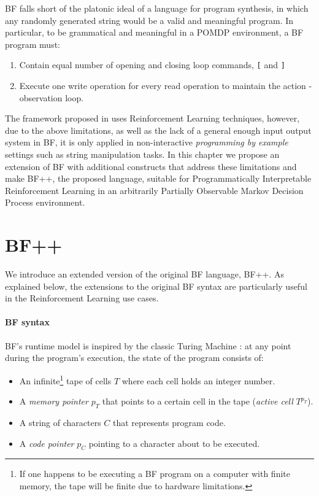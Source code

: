 BF falls short of the platonic ideal of a language for program synthesis, in which any randomly generated string would be a valid and meaningful program.
In particular, to be grammatical and meaningful in a POMDP environment, a BF program must:
\begin{enumerate}
    \item Contain equal number of opening and closing loop commands, \texttt{[} and \texttt{]}
    \item Execute one write operation for every read operation to maintain the action - observation loop.
\end{enumerate}

The framework proposed in \cite{abolafiaNeuralProgramSynthesis2018} uses Reinforcement Learning techniques, however, due to the above limitations, as well as the lack of a general enough input output system in BF, it is only applied in non-interactive \emph{programming by example} settings such as string manipulation tasks.
In this chapter we propose an extension of BF with additional constructs that address these limitations and make BF++, the proposed language, suitable for Programmatically Interpretable Reinforcement Learning in an arbitrarily Partially Observable Markov Decision Process environment.

\newpage
\section{BF++}
\label{sec:language}

We introduce an extended version of the original BF language, BF++. 
As explained below, the extensions to the original BF syntax are particularly useful in the Reinforcement Learning use cases. 

\paragraph{BF syntax}
\label{sec:bf}

BF's runtime model is inspired by the classic Turing Machine \cite{turing}: at any point during the program's execution, the state of the program consists of:

\begin{itemize}
    \item An infinite\footnote{If one happens to be executing a BF program on a computer with finite memory, the tape will be finite due to hardware limitations.} tape of cells $T$ where each cell holds an integer number.
    \item A \textit{memory pointer} $p_T$ that points to a certain cell in the tape (\textit{active cell} $T^{p_T}$).
    \item A string of characters $C$ that represents program code.
    \item A \textit{code pointer} $p_C$ pointing to a character about to be executed.
\end{itemize}

